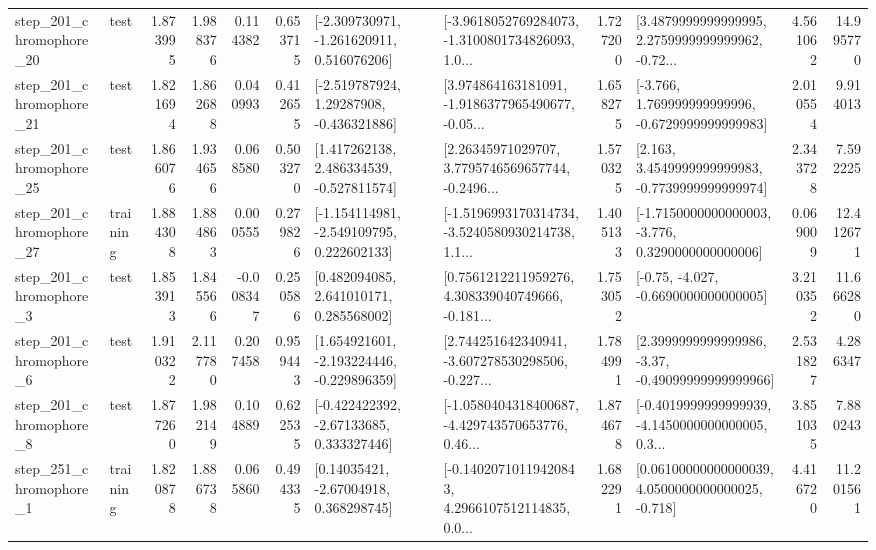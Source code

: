 \begin{tabular}{llrrrrllrlrr}
  step\_201\_chromophore\_20 &      test &      1.873995 &    1.988376 &      0.114382 &  0.653715 &   [-2.309730971, -1.261620911, 0.516076206] &  [-3.9618052769284073, -1.3100801734826093, 1.0... &       1.727200 &  [3.4879999999999995, 2.2759999999999962, -0.72... &            4.561062 &         14.995770 \\
  step\_201\_chromophore\_21 &      test &      1.821694 &    1.862688 &      0.040993 &  0.412655 &    [-2.519787924, 1.29287908, -0.436321886] &  [3.974864163181091, -1.9186377965490677, -0.05... &       1.658275 &   [-3.766, 1.769999999999996, -0.6729999999999983] &            2.010554 &          9.914013 \\
  step\_201\_chromophore\_25 &      test &      1.866076 &    1.934656 &      0.068580 &  0.503270 &    [1.417262138, 2.486334539, -0.527811574] &  [2.26345971029707, 3.7795746569657744, -0.2496... &       1.570325 &   [2.163, 3.4549999999999983, -0.7739999999999974] &            2.343728 &          7.592225 \\
  step\_201\_chromophore\_27 &  training &      1.884308 &    1.884863 &      0.000555 &  0.279826 &   [-1.154114981, -2.549109795, 0.222602133] &  [-1.5196993170314734, -3.5240580930214738, 1.1... &       1.405133 &  [-1.7150000000000003, -3.776, 0.3290000000000006] &            0.069009 &         12.412671 \\
   step\_201\_chromophore\_3 &      test &      1.853913 &    1.845566 &     -0.008347 &  0.250586 &     [0.482094085, 2.641010171, 0.285568002] &  [0.7561212211959276, 4.308339040749666, -0.181... &       1.753052 &               [-0.75, -4.027, -0.6690000000000005] &            3.210352 &         11.666280 \\
   step\_201\_chromophore\_6 &      test &      1.910322 &    2.117780 &      0.207458 &  0.959443 &   [1.654921601, -2.193224446, -0.229896359] &  [2.744251642340941, -3.607278530298506, -0.227... &       1.784991 &  [2.3999999999999986, -3.37, -0.49099999999999966] &            2.531827 &          4.286347 \\
   step\_201\_chromophore\_8 &      test &      1.877260 &    1.982149 &      0.104889 &  0.622535 &    [-0.422422392, -2.67133685, 0.333327446] &  [-1.0580404318400687, -4.429743570653776, 0.46... &       1.874678 &  [-0.4019999999999939, -4.1450000000000005, 0.3... &            3.851035 &          7.880243 \\
   step\_251\_chromophore\_1 &  training &      1.820878 &    1.886738 &      0.065860 &  0.494335 &      [0.14035421, -2.67004918, 0.368298745] &  [-0.14020710119420843, 4.2966107512114835, 0.0... &       1.682291 &  [0.06100000000000039, 4.0500000000000025, -0.718] &            4.416720 &         11.201561 \\

\end{tabular}

